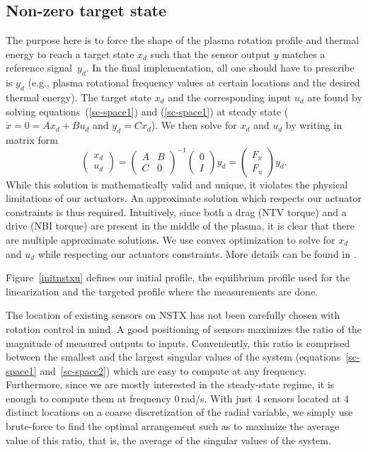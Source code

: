 \documentclass[12pt,lot, lof]{puthesis}
\begin{document}
\subsection{Non-zero target state}
The purpose here is to force the shape of the plasma rotation profile and thermal energy to reach a target state $x_d$ such that the sensor output $y$ matches a reference signal~$y_d$. In the final implementation, all one should have to prescribe is $y_d$ (e.g., plasma rotational frequency values at certain locations and the desired thermal energy). The target state $x_d$ and the corresponding input $u_d$ are found by solving equations~(\ref{sc-space1}) and (\ref{sc-space1}) at steady state ($\dot x = 0 = A x_d + B u_d$ and $y_d = C x_d$).
%
We then solve for $x_d$ and $u_d$ by writing in matrix form
\begin{equation}
\left(\! \begin{array}{c}  x_{d} \\ u_{d}\end{array}\!\right)
  ={ \left(\! \begin{array}{cc} A  & B \\ C & 0 \end{array} \! \right)}^{-1} \left(\! \begin{array}{c} 0 \\ I    \end{array}  \!\right) y_{d} = \left(\! \begin{array}{c} F_x \\ F_u    \end{array}  \!\right) y_{d}.
\label{steadystate}
\end{equation}
While this solution is mathematically valid and unique, it violates the physical limitations of our actuators.
An approximate solution which respects our actuator constraints is thus required.
Intuitively, since both a drag (NTV torque) and a drive (NBI torque) are present in the middle of the plasma, it is clear that there are multiple approximate solutions.
We use convex optimization to solve for $x_d$ and $u_d$ while respecting our actuators constraints. More details can be found in \cite{cvx, gb08}.


Figure~\ref{initnstxu} defines our initial profile, the equilibrium profile used for the linearization and the targeted profile where the measurements are done.

The location of existing sensors on NSTX has not been carefully chosen with rotation control in mind.
A good positioning of sensors maximizes the ratio of the magnitude of measured outputs to inputs.
Conveniently, this ratio is comprised between the smallest and the largest singular values of the system (equations~\ref{sc-space1} and~\ref{sc-space2}) which are easy to compute at any frequency.
Furthermore, since we are mostly interested in the steady-state regime, it is enough to compute them at frequency 0\,rad/s.
With just 4 sensors located at 4 distinct locations on a coarse discretization of the radial variable, we simply use brute-force to find the optimal arrangement such as to maximize the average value of this ratio, that is, the average of the singular values of the system.
\end{document}
